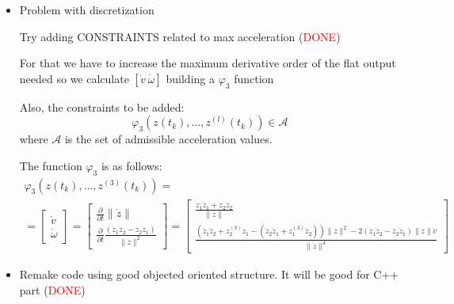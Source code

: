 
\begin{itemize}
\item Problem with discretization

Try adding CONSTRAINTS related to max acceleration (\textcolor{red}{DONE})

For that we have to increase the maximum derivative order of the flat output needed so we calculate $[\dot{v}\ \dot{\omega}]$ building a $\varphi_3$ function

Also, the constraints to be added:
\[
	\varphi_3(z(t_k),\dotsc,z^{(l)}(t_k)) \in \mathcal{A}
\]
where $\mathcal{A}$ is the set of admissible acceleration values.

The function $\varphi_3$ is as follows:
\[
\begin{array}{l}
\varphi_3(z(t_k),\dotsc,z^{(3)}(t_k))=\\
=\left[\begin{array}{c}
\dot{v}\\
\dot{\omega}
\end{array}\right]
= \left[\begin{array}{c}
\frac{\partial}{\partial t}\|\dot{z}\|\\
\frac{\partial}{\partial t}\frac{(\dot{z}_1\ddot{z}_2-\dot{z}_2\ddot{z}_1)}{\|\dot{z}\|^2}
\end{array}\right] = \left[\begin{array}{c}
\frac{\dot{z}_1\ddot{z}_1 + \dot{z}_2\ddot{z}_2}{\|\dot{z}\|}\\
\frac{(\ddot{z}_1\ddot{z}_2+ z^{(3)}_2\dot{z}_1 - (\ddot{z}_2\ddot{z}_1+z^{(3)}_1\dot{z}_2))\|\dot{z}\|^2-2(\dot{z}_1\ddot{z}_2-\dot{z}_2\ddot{z}_1)\|\dot{z}\|\dot{v}}{\|\dot{z}\|^4}
\end{array}\right]
\end{array}
\]


% 
% 

\item Remake code using good objected oriented structure. It will be good for C++ part (\textcolor{red}{DONE})

\end{itemize}

